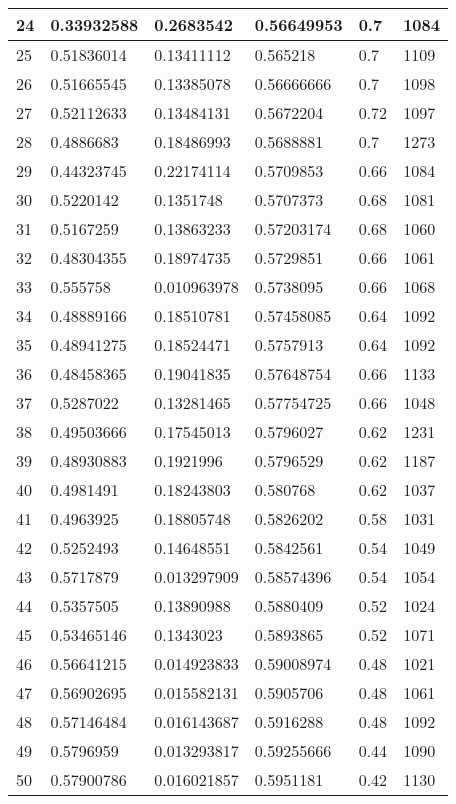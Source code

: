 \begin{longtable}{|l|l|l|l|l|l|}
24 & 0.33932588 & 0.2683542 & 0.56649953 & 0.7 & 1084 \\ \hline 
25 & 0.51836014 & 0.13411112 & 0.565218 & 0.7 & 1109 \\ \hline 
26 & 0.51665545 & 0.13385078 & 0.56666666 & 0.7 & 1098 \\ \hline 
27 & 0.52112633 & 0.13484131 & 0.5672204 & 0.72 & 1097 \\ \hline 
28 & 0.4886683 & 0.18486993 & 0.5688881 & 0.7 & 1273 \\ \hline 
29 & 0.44323745 & 0.22174114 & 0.5709853 & 0.66 & 1084 \\ \hline 
30 & 0.5220142 & 0.1351748 & 0.5707373 & 0.68 & 1081 \\ \hline 
31 & 0.5167259 & 0.13863233 & 0.57203174 & 0.68 & 1060 \\ \hline 
32 & 0.48304355 & 0.18974735 & 0.5729851 & 0.66 & 1061 \\ \hline 
33 & 0.555758 & 0.010963978 & 0.5738095 & 0.66 & 1068 \\ \hline 
34 & 0.48889166 & 0.18510781 & 0.57458085 & 0.64 & 1092 \\ \hline 
35 & 0.48941275 & 0.18524471 & 0.5757913 & 0.64 & 1092 \\ \hline 
36 & 0.48458365 & 0.19041835 & 0.57648754 & 0.66 & 1133 \\ \hline 
37 & 0.5287022 & 0.13281465 & 0.57754725 & 0.66 & 1048 \\ \hline 
38 & 0.49503666 & 0.17545013 & 0.5796027 & 0.62 & 1231 \\ \hline 
39 & 0.48930883 & 0.1921996 & 0.5796529 & 0.62 & 1187 \\ \hline 
40 & 0.4981491 & 0.18243803 & 0.580768 & 0.62 & 1037 \\ \hline 
41 & 0.4963925 & 0.18805748 & 0.5826202 & 0.58 & 1031 \\ \hline 
42 & 0.5252493 & 0.14648551 & 0.5842561 & 0.54 & 1049 \\ \hline 
43 & 0.5717879 & 0.013297909 & 0.58574396 & 0.54 & 1054 \\ \hline 
44 & 0.5357505 & 0.13890988 & 0.5880409 & 0.52 & 1024 \\ \hline 
45 & 0.53465146 & 0.1343023 & 0.5893865 & 0.52 & 1071 \\ \hline 
46 & 0.56641215 & 0.014923833 & 0.59008974 & 0.48 & 1021 \\ \hline 
47 & 0.56902695 & 0.015582131 & 0.5905706 & 0.48 & 1061 \\ \hline 
48 & 0.57146484 & 0.016143687 & 0.5916288 & 0.48 & 1092 \\ \hline 
49 & 0.5796959 & 0.013293817 & 0.59255666 & 0.44 & 1090 \\ \hline 
50 & 0.57900786 & 0.016021857 & 0.5951181 & 0.42 & 1130 \\ \hline 
\end{longtable}